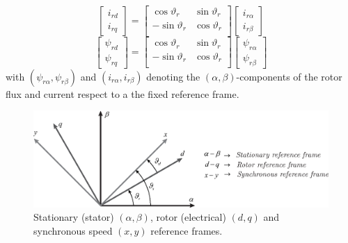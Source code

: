 \documentclass[11pt,a4paper,oneside]{book}
\numberwithin{equation}{section}
\theoremstyle{it}
\theoremstyle{definition}
\begin{document}
\begin{equation} \label{eq34}
	\left[
	\begin{matrix}
		i_{rd} \\[6pt]
		i_{rq}
	\end{matrix} \right] = 
	\left[
	\begin{matrix}
		\cos\vartheta_r & \sin\vartheta_r \\[6pt]
		-\sin\vartheta_r & \cos\vartheta_r \\[6pt]
	\end{matrix} \right]
	\left[
	\begin{matrix}
		i_{r\alpha} \\[6pt]
		i_{r\beta}
	\end{matrix} \right]
\end{equation}
\begin{equation} \label{eq35}
	\left[
	\begin{matrix}
		\psi_{rd} \\[6pt]
		\psi_{rq}
	\end{matrix} \right] = 
	\left[
	\begin{matrix}
		\cos\vartheta_r & \sin\vartheta_r \\[6pt]
		-\sin\vartheta_r & \cos\vartheta_r \\[6pt]
	\end{matrix} \right]
	\left[
	\begin{matrix}
		\psi_{r\alpha} \\[6pt]
		\psi_{r\beta}
	\end{matrix} \right]
\end{equation}
with $(\psi_{r\alpha},\psi_{r\beta})$ and $(i_{r\alpha}, i_{r\beta})$ denoting the $(\alpha,\beta)$-components of the rotor flux and current respect to a the fixed reference frame.
\begin{figure}[H]
	\centering
	\includegraphics[width = 400pt, keepaspectratio]{figures/reference_frames_2.eps}
	\captionsetup{width=0.5\textwidth, font=small}		
	\caption{Stationary (stator) $(\alpha,\beta)$, rotor (electrical) $(d,q)$ and synchronous speed $(x,y)$ reference frames.}
	\label{reference_frames} 
\end{figure}
\end{document}
